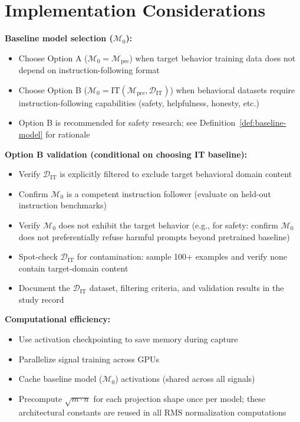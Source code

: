 \documentclass[11pt]{article}
\begin{document}
\section{Implementation Considerations}
\label{app:implementation}

\noindent\textbf{Baseline model selection ($\mathcal{M}_0$):}
\begin{itemize}[nosep]
\item Choose Option A ($\mathcal{M}_0 = \mathcal{M}_{\text{pre}}$) when target behavior training data does not depend on instruction-following format
\item Choose Option B ($\mathcal{M}_0 = \text{IT}(\mathcal{M}_{\text{pre}}, \mathcal{D}_{\text{IT}})$) when behavioral datasets require instruction-following capabilities (safety, helpfulness, honesty, etc.)
\item Option B is recommended for safety research; see Definition~\ref{def:baseline-model} for rationale
\end{itemize}

\noindent\textbf{Option B validation (conditional on choosing IT baseline):}
\begin{itemize}[nosep]
\item Verify $\mathcal{D}_{\text{IT}}$ is explicitly filtered to exclude target behavioral domain content
\item Confirm $\mathcal{M}_0$ is a competent instruction follower (evaluate on held-out instruction benchmarks)
\item Verify $\mathcal{M}_0$ does not exhibit the target behavior (e.g., for safety: confirm $\mathcal{M}_0$ does not preferentially refuse harmful prompts beyond pretrained baseline)
\item Spot-check $\mathcal{D}_{\text{IT}}$ for contamination: sample 100+ examples and verify none contain target-domain content
\item Document the $\mathcal{D}_{\text{IT}}$ dataset, filtering criteria, and validation results in the study record
\end{itemize}

\noindent\textbf{Computational efficiency:}
\begin{itemize}[nosep]
\item Use activation checkpointing to save memory during capture
\item Parallelize signal training across GPUs
\item Cache baseline model ($\mathcal{M}_0$) activations (shared across all signals)
\item Precompute $\sqrt{m \cdot n}$ for each projection shape once per model; these architectural constants are reused in all RMS normalization computations
\end{itemize}
\end{document}
